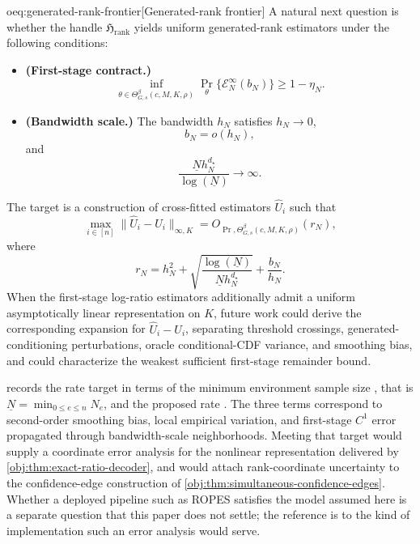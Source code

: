 \begin{remarkv}{oeq:generated-rank-frontier}[Generated-rank frontier]
A natural next question is whether the handle \(\mathfrak H_{\mathrm{rank}}\) yields uniform generated-rank estimators under the following conditions:
\begin{itemize}
\item \textbf{(First-stage contract.)}
\[
\inf_{\theta\in\Theta^{\beta}_{G,s}(c,M,K,\rho)}
\Pr_\theta\{\mathcal E_N^{\infty}(b_N)\}\ge 1-\eta_N .
\]
\item \textbf{(Bandwidth scale.)} The bandwidth \(h_N\) satisfies \(h_N\to0\),
\[
b_N=o(h_N),
\]
and
\[
\frac{\underline N h_N^{d_\star}}{\log(\underline N)}\to\infty .
\]
\end{itemize}
The target is a construction of cross-fitted estimators \(\widehat U_i\) such that
\[
\max_{i\in[n]}\|\widehat U_i-U_i\|_{\infty,K}
=
O_{\Pr,\Theta^{\beta}_{G,s}(c,M,K,\rho)}(r_N),
\]
where
\[
r_N
=
h_N^2+
\sqrt{\frac{\log(\underline N)}{\underline N h_N^{d_\star}}}
+\frac{b_N}{h_N}.
\]
When the first-stage log-ratio estimators additionally admit a uniform asymptotically linear representation on \(K\), future work could derive the corresponding expansion for \(\widehat U_i-U_i\), separating threshold crossings, generated-conditioning perturbations, oracle conditional-CDF variance, and smoothing bias, and could characterize the weakest sufficient first-stage remainder bound.
\end{remarkv}

 records the rate target in terms of the minimum environment sample size , that is \(\underline N=\min_{0\le e\le n}N_e\), and the proposed rate . The three terms correspond to second-order smoothing bias, local empirical variation, and first-stage \(C^1\) error propagated through bandwidth-scale neighborhoods. Meeting that target would supply a coordinate error analysis for the nonlinear representation delivered by \cref{obj:thm:exact-ratio-decoder}, and would attach rank-coordinate uncertainty to the confidence-edge construction of \cref{obj:thm:simultaneous-confidence-edges}. Whether a deployed pipeline such as ROPES \citep{ROPES2025} satisfies the model assumed here is a separate question that this paper does not settle; the reference is to the kind of implementation such an error analysis would serve.

